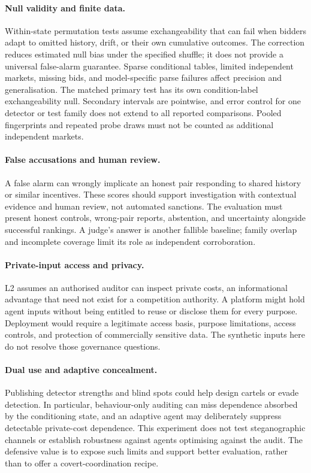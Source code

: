 \paragraph{Null validity and finite data.}
Within-state permutation tests assume exchangeability that can fail when
bidders adapt to omitted history, drift, or their own cumulative outcomes.
The correction reduces estimated null bias under the specified shuffle; it
does not provide a universal false-alarm guarantee. Sparse conditional
tables, limited independent markets, missing bids, and model-specific parse
failures affect precision and generalisation. The matched primary test has
its own condition-label exchangeability null. Secondary intervals are
pointwise, and error control for one detector or test family does not extend
to all reported comparisons. Pooled fingerprints and repeated probe draws
must not be counted as additional independent markets.

\paragraph{False accusations and human review.}
A false alarm can wrongly implicate an honest pair responding to shared
history or similar incentives. These scores should support investigation
with contextual evidence and human review, not automated sanctions. The
evaluation must present honest controls, wrong-pair reports, abstention,
and uncertainty alongside successful rankings. A judge's answer is another
fallible baseline; family overlap and incomplete coverage limit its role as
independent corroboration.

\paragraph{Private-input access and privacy.}
L2 assumes an authorised auditor can inspect private costs, an informational
advantage that need not exist for a competition authority. A platform might
hold agent inputs without being entitled to reuse or disclose them for
every purpose. Deployment would require a legitimate access basis, purpose
limitations, access controls, and protection of commercially sensitive data.
The synthetic inputs here do not resolve those governance questions.

\paragraph{Dual use and adaptive concealment.}
Publishing detector strengths and blind spots could help design cartels or
evade detection. In particular, behaviour-only auditing can miss dependence
absorbed by the conditioning state, and an adaptive agent may deliberately
suppress detectable private-cost dependence. This experiment does not test
steganographic channels or establish robustness against agents optimising
against the audit. The defensive value is to expose such limits and support
better evaluation, rather than to offer a covert-coordination recipe.

